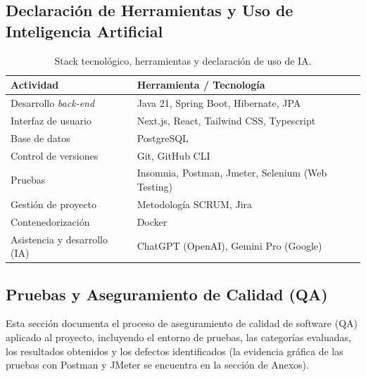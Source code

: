 \documentclass[12pt, atypical, journal]{article}
\begin{document}
\subsection{Declaración de Herramientas y Uso de Inteligencia Artificial}
\begin{table}[H]
\centering
\caption{Stack tecnológico, herramientas y declaración de uso de IA.}
\label{tab:tecnologias}
\begin{tabular}{ll}
\toprule
\textbf{Actividad} & \textbf{Herramienta / Tecnología} \\
\midrule
Desarrollo \textit{back-end} & Java 21, Spring Boot, Hibernate, JPA \\
Interfaz de usuario & Next.js, React, Tailwind CSS, Typescript \\
Base de datos & PostgreSQL \\
Control de versiones & Git, GitHub CLI \\
Pruebas & Insomnia, Postman, Jmeter, Selenium (Web Testing)  \\ %
Gestión de proyecto & Metodología SCRUM, Jira \\
Contenedorización & Docker \\
Asistencia y desarrollo (IA) & ChatGPT (OpenAI), Gemini Pro (Google) \\
\bottomrule
\end{tabular}
\end{table}

\subsection{Pruebas y Aseguramiento de Calidad (QA)}
Esta sección documenta el proceso de aseguramiento de calidad de software (QA) aplicado al proyecto, incluyendo el entorno de pruebas, las categorías evaluadas, los resultados obtenidos y los defectos identificados (la evidencia gráfica de las pruebas con Postman y JMeter se encuentra en la sección de Anexos).
\end{document}
